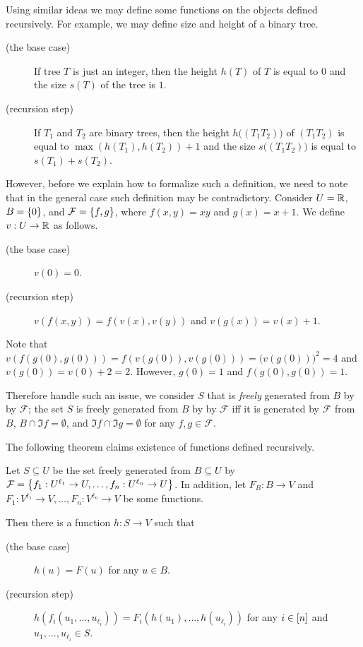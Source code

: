 Using similar ideas we may define some functions on the objects defined
recursively. For example, we may define size and height of a binary tree.
\begin{description}
    \item [(the base case)] If tree $T$ is just an integer, then the height $h(T)$
        of $T$ is equal to $0$ and the size $s(T)$ of the tree is $1$.
    \item[(recursion step)] If $T_1$ and $T_2$ are binary trees, then the height
        $h\big((T_1 T_2)\big)$ of $(T_1 T_2)$ is equal to $\max(h(T_1), h(T_2)) + 1$
        and the size $s\big((T_1 T_2)\big)$ is equal to $s(T_1) + s(T_2)$.
\end{description}

However, before we explain how to formalize such a definition, we need to note
that in the general case such definition may be contradictory. Consider
$U = \mathbb{R}$, $B = \set{0}$, and $\mathcal{F} = \set{f, g}$, where $f(x, y) = xy$
and $g(x) = x + 1$. We define $v : U \to \mathbb{R}$ as follows.
\begin{description}
    \item [(the base case)] $v(0) = 0$.
    \item[(recursion step)] $v(f(x, y)) = f(v(x), v(y))$ and $v(g(x)) = v(x) + 1$.
\end{description}
Note that $v(f(g(0), g(0))) = f(v(g(0)), v(g(0))) = \big(v(g(0))\big)^2 = 4$
and $v(g(0)) = v(0) + 2 = 2$.
However, $g(0) = 1$ and $f(g(0), g(0)) = 1$.

Therefore handle such an issue, we consider $S$ that is \emph{freely} generated
from $B$ by by $\mathcal{F}$; the set $S$ is freely generated
from $B$ by by $\mathcal{F}$ iff it is generated by $\mathcal{F}$ from $B$,
$B \cap \Im f = \emptyset$, and $\Im f \cap \Im g = \emptyset$ for any
$f, g \in \mathcal{F}$.

The following theorem claims existence of functions defined recursively.
\begin{theorem}
\label{theorem:recursion-principle}
    Let $S \subseteq U$ be the set freely generated from $B \subseteq U$ by
    $\mathcal{F} = \set{f_1 : U^{\ell_1} \to U, \dots, f_n : U^{\ell_n} \to U}$.
    In addition, let $F_B : B \to V$ and
    $F_1 : V^{\ell_1} \to V, \dots, F_n : V^{\ell_n} \to V$ be some functions.

    Then there is a function $h : S \to V$ such that
    \begin{description}
        \item [(the base case)] $h(u) = F(u)$ for any $u \in B$.
        \item[(recursion step)] $h(f_i(u_1, \dots, u_{\ell_i})) =
            F_i(h(u_1), \dots, h(u_{\ell_i}))$ for any $i \in [{n}]$ and
            $u_1, \dots, u_{\ell_i} \in S$.
    \end{description}
\end{theorem}


